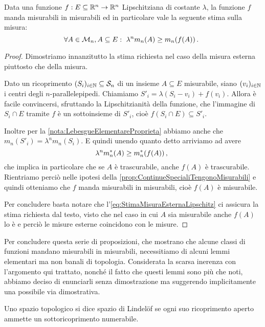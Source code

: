 \begin{proposition}\label{prop:LipschitzTengonoMisurabili}
	Data una funzione $f:E\subseteq \mathbb R^n\to\mathbb R^n$ Lipschitziana di costante $\lambda$, la funzione $f$ manda misurabili in misurabili ed in particolare vale la seguente stima sulla misura:
	\begin{equation*}
		\forall A\in\mathcal M_n, A\subseteq E:\ \lambda^n m_n(A) \ge m_n(f(A)) \, \text{. }
	\end{equation*}
\end{proposition}
\begin{proof}
	Dimostriamo innanzitutto la stima richiesta nel caso della misura esterna piuttosto che della misura.
	
	Dato un ricoprimento $(S_i)_{i\in\mathbb N}\subseteq \mathcal S_n$ di un insieme $A\subseteq E$ misurabile, siano $(v_i)_{i\in\mathbb N}$ i centri degli $n$-parallelepipedi.
	Chiamiamo $S'_i=\lambda(S_i-v_i)+f(v_i)$.
	Allora è facile convincersi, sfruttando la Lipschitzianità della funzione, che l'immagine di $S_i\cap E$ tramite $f$ è un sottoinsieme di $S'_i$, cioè $f(S_i\cap E)\subseteq S'_i$.
	
	Inoltre per la \cref{nota:LebesgueElementareProprieta} abbiamo anche che $m_n(S'_i)=\lambda^n m_n(S_i)$. 
	E quindi unendo quanto detto arriviamo ad avere
	\begin{equation}\label{eq:StimaMisuraEsternaLipschitz}
		\lambda^n m_n^*(A) \ge m_n^*(f(A))  \, \text{, }
	\end{equation}
	che implica in particolare che se $A$ è trascurabile, anche $f(A)$ è trascurabile.
	Rientriamo perciò nelle ipotesi della \cref{prop:ContinueSpecialiTengonoMisurabili} e quindi otteniamo che $f$ manda misurabili in misurabili, cioè $f(A)$ è misurabile.
	
	Per concludere basta notare che l'\cref{eq:StimaMisuraEsternaLipschitz} ci assicura la stima richiesta dal testo, visto che nel caso in cui $A$ sia misurabile anche $f(A)$ lo è e perciò le misure esterne coincidono con le misure.
\end{proof}

Per concludere questa serie di proposizioni, che mostrano che alcune classi di funzioni mandano misurabili in misurabili, necessitiamo di alcuni lemmi elementari ma non banali di topologia.
Considerata la scarsa inerenza con l'argomento qui trattato, nonché il fatto che questi lemmi sono più che noti, abbiamo deciso di enunciarli senza dimostrazione ma suggerendo implicitamente una possibile via dimostrativa.

\begin{definition}\label{def:Lindelof}
	Uno spazio topologico si dice spazio di Lindelöf se ogni suo ricoprimento aperto ammette un sottoricoprimento numerabile. 
\end{definition}

